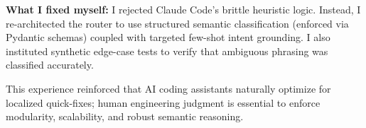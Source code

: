 \documentclass[10pt,a4paper]{article}
\begin{document}
\textbf{What I fixed myself:} I rejected Claude Code's brittle heuristic logic. Instead, I re-architected the router to use structured semantic classification (enforced via Pydantic schemas) coupled with targeted few-shot intent grounding. I also instituted synthetic edge-case tests to verify that ambiguous phrasing was classified accurately.

This experience reinforced that AI coding assistants naturally optimize for localized quick-fixes; human engineering judgment is essential to enforce modularity, scalability, and robust semantic reasoning.
\end{document}
